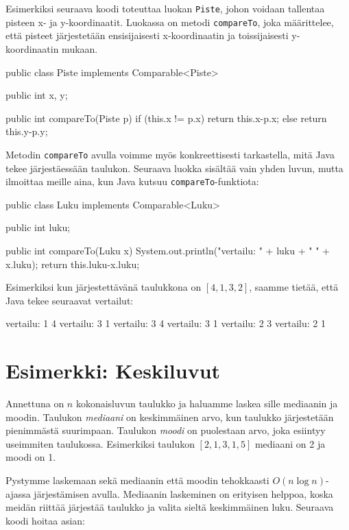 Esimerkiksi seuraava koodi toteuttaa luokan \texttt{Piste},
johon voidaan tallentaa pisteen x- ja y-koordinaatit.
Luokassa on metodi \texttt{compareTo}, joka määrittelee,
että pisteet järjestetään ensisijaisesti x-koordinaatin ja
toissijaisesti y-koordinaatin mukaan.

\begin{code}
public class Piste implements Comparable<Piste> {
    public int x, y;

    public int compareTo(Piste p) {
        if (this.x != p.x) {
            return this.x-p.x;
        } else {
            return this.y-p.y;
        }
    }
}
\end{code}

Metodin \texttt{compareTo} avulla voimme myös konkreettisesti
tarkastella, mitä Java tekee järjestäessään taulukon.
Seuraava luokka sisältää vain yhden luvun,
mutta ilmoittaa meille aina, kun Java kutsuu
\texttt{compareTo}-funktiota:

\begin{code}
public class Luku implements Comparable<Luku> {
    public int luku;

    public int compareTo(Luku x) {
        System.out.println("vertailu: " + luku + " " + x.luku);
        return this.luku-x.luku;
    }
}
\end{code}

Esimerkiksi kun järjestettävänä taulukkona on $[4,1,3,2]$,
saamme tietää, että Java tekee seuraavat vertailut:

\begin{code}
vertailu: 1 4
vertailu: 3 1
vertailu: 3 4
vertailu: 3 1
vertailu: 2 3
vertailu: 2 1
\end{code}

\section{Esimerkki: Keskiluvut}

Annettuna on $n$ kokonaisluvun taulukko ja haluamme
laskea sille mediaanin ja moodin.
Taulukon \emph{mediaani} on keskimmäinen arvo, kun taulukko järjestetään
pienimmästä suurimpaan.
Taulukon \emph{moodi} on puolestaan arvo, joka esiintyy useimmiten taulukossa.
Esimerkiksi taulukon $[2,1,3,1,5]$ mediaani on 2 ja moodi on 1.

Pystymme laskemaan sekä mediaanin että moodin tehokkaasti
$O(n \log n)$-ajassa järjestämisen avulla.
Mediaanin laskeminen on erityisen helppoa,
koska meidän riittää järjestää taulukko ja valita
sieltä keskimmäinen luku. Seuraava koodi hoitaa asian:

